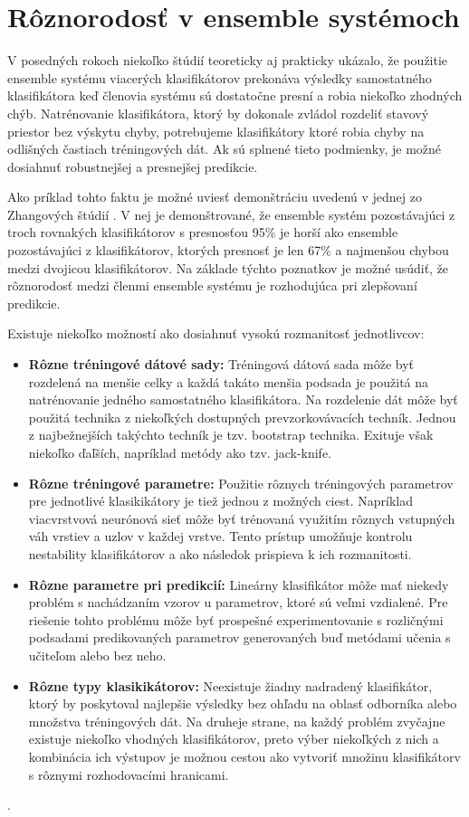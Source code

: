 \section{Rôznorodosť v ensemble systémoch}

V posedných rokoch niekoľko štúdií teoreticky \cite{bibid} aj prakticky \cite{bibid} ukázalo, že použitie ensemble systému viacerých klasifikátorov prekonáva výsledky samostatného klasifikátora keď členovia systému sú dostatočne presní a robia niekoľko zhodných chýb. Natrénovanie klasifikátora, ktorý by dokonale zvládol rozdeliť stavový priestor bez výskytu chyby, potrebujeme klasifikátory ktoré robia chyby na odlišných častiach tréningových dát. Ak sú splnené tieto podmienky, je možné dosiahnuť robustnejšej a presnejšej predikcie. 

Ako príklad tohto faktu je možné uviesť demonštráciu uvedenú v jednej zo Zhangových štúdií \cite{}. V nej je demonštrované, že ensemble systém pozostávajúci z troch rovnakých klasifikátorov s presnosťou 95\% je horší ako ensemble pozostávajúci z klasifikátorov, ktorých presnosť je len 67\% a najmenšou chybou medzi dvojicou klasifikátorov. Na základe týchto poznatkov je možné usúdiť, že rôznorodosť medzi členmi ensemble systému je rozhodujúca pri zlepšovaní predikcie.

Existuje niekoľko možností ako dosiahnuť vysokú rozmanitosť jednotlivcov:
\begin{itemize}
	\item \textbf{Rôzne tréningové dátové sady:} Tréningová dátová sada môže byť rozdelená na menšie celky a každá takáto menšia podsada je použitá na natrénovanie jedného samostatného klasifikátora. Na rozdelenie dát môže byť použitá technika z niekoľkých dostupných prevzorkovávacích techník. Jednou z najbežnejších takýchto techník je tzv. bootstrap technika. Exituje však niekoľko ďaľších, napríklad metódy ako tzv. jack-knife.
	\item \textbf{Rôzne tréningové parametre:} Použitie rôznych tréningových parametrov pre jednotlivé klasikikátory je tiež jednou z možných ciest. Napríklad viacvrstvová neurónová sieť môže byť trénovaná využitím rôznych vstupných váh vrstiev a uzlov v každej vrstve. Tento prístup umožňuje kontrolu nestability klasifikátorov a ako následok prispieva k ich rozmanitosti. 	
	\item \textbf{Rôzne parametre pri predikcií:} Lineárny klasifikátor môže mať niekedy problém s nachádzaním vzorov u parametrov, ktoré sú veľmi vzdialené. Pre riešenie tohto problému môže byť prospešné experimentovanie s rozličnými podsadami predikovaných parametrov generovaných buď metódami učenia s učiteľom alebo bez neho. \cite{}	
	\item \textbf{Rôzne typy klasikikátorov:} Neexistuje žiadny nadradený klasifikátor, ktorý by poskytoval najlepšie výsledky bez ohľadu na oblasť odborníka alebo množstva tréningových dát. Na druheje strane, na každý problém zvyčajne existuje niekoľko vhodných klasifikátorov, preto výber niekoľkých z nich a kombinácia ich výstupov je možnou cestou ako vytvoriť množinu klasifikátorv s rôznymi rozhodovacími hranicami.
\end{itemize}
.

